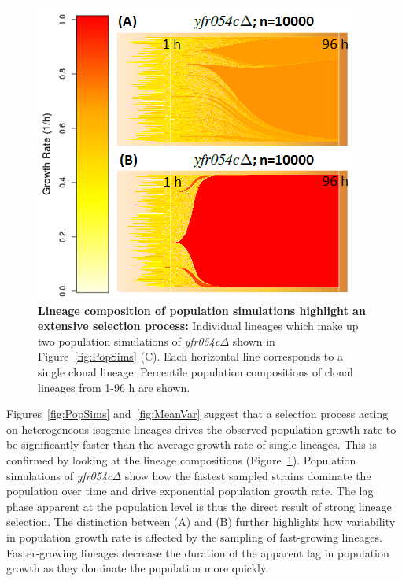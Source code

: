 \documentclass{bioinfo}
\begin{document}
\begin{figure}[H]
\vspace{-2em}
\centering
\includegraphics[width=0.75\linewidth]{Ch1FishPlots.png}
\vspace{-1em}
\caption{\footnotesize{\textbf{Lineage composition of population simulations highlight an extensive selection process:} Individual lineages which make up two population simulations of \textit{yfr054c}$\Delta$ shown in Figure~\ref{fig:PopSims} (C). Each horizontal line corresponds to a single clonal lineage. Percentile population compositions of clonal lineages from 1-96 h are shown.}}
\label{fig:FishPlot}
\vspace{-3em}
\end{figure}

Figures~\ref{fig:PopSims} and~\ref{fig:MeanVar} suggest that a selection process acting on heterogeneous isogenic lineages drives the observed population growth rate to be significantly faster than the average growth rate of single lineages. This is confirmed by looking at the lineage compositions (Figure~\ref{fig:FishPlot}). Population simulations of \textit{yfr054c}$\Delta$ show how the fastest sampled strains dominate the population over time and drive exponential population growth rate. The lag phase apparent at the population level is thus the direct result of strong lineage selection. The distinction between (A) and (B) further highlights how variability in population growth rate is affected by the sampling of fast-growing lineages. Faster-growing lineages decrease the duration of the apparent lag in population growth as they dominate the population more quickly. 
\end{document}
